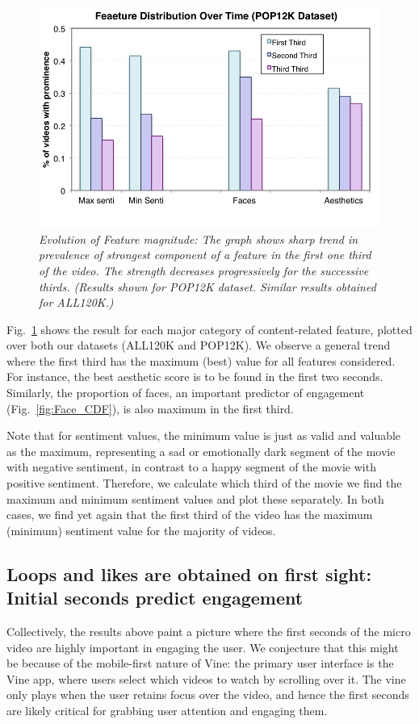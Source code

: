 \begin{figure}[!htb]
\centering
\includegraphics[width=\columnwidth]{plots/ThirdsDistribution.png}
\caption{\textsl{Evolution of Feature magnitude: The graph shows sharp trend in prevalence of strongest component of a feature in the first one third of the video. The strength decreases progressively for the successive thirds. (Results shown for POP12K dataset. Similar results obtained for ALL120K.)}}
\label{fig:Face_Thirds}
\end{figure}

Fig.~\ref{fig:Face_Thirds} shows the result for each major category of content-related feature, plotted over both our datasets (ALL120K and POP12K). We observe a general trend where the first third has the maximum (best) value for all features considered. For instance, the best aesthetic score is to be found in the first two seconds. Similarly, the proportion of faces, an important predictor of engagement (Fig.~\ref{fig:Face_CDF}), is also maximum in the first third. 

Note that for sentiment values, the minimum value is just as valid and valuable as the maximum, representing a sad or emotionally dark segment of the movie with negative sentiment, in contrast to a happy segment of the movie with positive sentiment. Therefore, we calculate which third of the movie we find the maximum and minimum sentiment values and plot these separately. In both cases, we find  yet again that the first third of the video has the maximum (minimum) sentiment value for the majority of videos. 

\subsection{Loops and likes are obtained on first sight: Initial seconds predict engagement}
\label{sec:first-seconds}
Collectively, the results above paint a picture where the first seconds of the micro video are highly important in engaging the user. We conjecture that this might be because of the mobile-first nature of Vine: the primary user interface is the Vine app, where users select which videos to watch by scrolling over it. The vine only plays when the user retains focus over the video, and hence the first seconds are likely critical for grabbing user attention and engaging them. 

